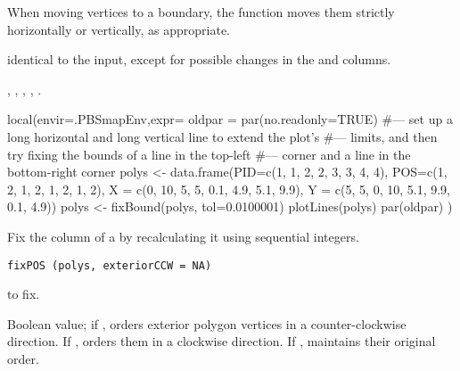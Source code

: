 \documentclass[letterpaper]{book}
\begin{document}
%
\begin{Details}\relax
When moving vertices to a boundary, the function moves them strictly
horizontally or vertically, as appropriate.
\end{Details}
%
\begin{Value}
 identical to the input, except for possible changes in
the  and  columns.
\end{Value}
%
\begin{SeeAlso}\relax
{},
,
,
,
.
\end{SeeAlso}
%
\begin{Examples}
\begin{ExampleCode}
local(envir=.PBSmapEnv,expr={
  oldpar = par(no.readonly=TRUE)
  #--- set up a long horizontal and long vertical line to extend the plot's
  #--- limits, and then try fixing the bounds of a line in the top-left
  #--- corner and a line in the bottom-right corner
  polys <- data.frame(PID=c(1, 1, 2, 2,  3, 3, 4, 4),
    POS=c(1, 2, 1, 2,  1, 2, 1, 2),
    X = c(0, 10, 5, 5, 0.1, 4.9, 5.1, 9.9),
    Y = c(5, 5, 0, 10, 5.1, 9.9, 0.1, 4.9))
  polys <- fixBound(polys, tol=0.0100001)
  plotLines(polys)
  par(oldpar)
})
\end{ExampleCode}
\end{Examples}
%
\begin{Description}\relax
Fix the  column of a  by recalculating it
using sequential integers.
\end{Description}
%
\begin{Usage}
\begin{verbatim}
fixPOS (polys, exteriorCCW = NA)
\end{verbatim}
\end{Usage}
%
\begin{Arguments}
\begin{ldescription}
\item[\code{polys}]  to fix.
\item[\code{exteriorCCW}] Boolean value; if , orders exterior
polygon vertices in a counter-clockwise direction.  If ,
orders them in a clockwise direction.  If , maintains their
original order.
\end{ldescription}
\end{Arguments}
\end{document}
